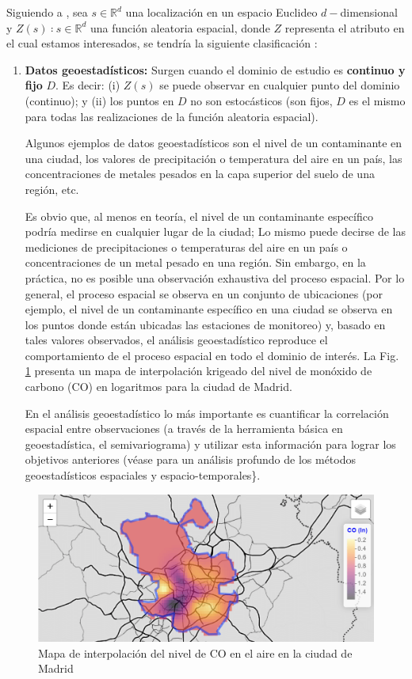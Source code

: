 \documentclass[
]{book}
\theoremstyle{definition}
\theoremstyle{definition}
\theoremstyle{definition}
\theoremstyle{definition}
\theoremstyle{remark}
\begin{document}
Siguiendo a \citet{cressie1993}, sea \(s ∈ ℝ^d\) una localización en un espacio Euclideo
\(d-\)dimensional y \({Z(s)∶ s ∈ ℝ^d}\) una función aleatoria espacial, donde \(Z\)
representa el atributo en el cual estamos interesados, se tendría la siguiente
clasificación \citep{montero_et_al_2015}:

\begin{enumerate}
\def\labelenumi{\arabic{enumi}.}
\item
  \textbf{Datos geoestadísticos:} Surgen cuando el dominio de estudio es \textbf{continuo
  y fijo} \(D\). Es decir: (i) \(Z(s)\) se puede observar en cualquier punto del
  dominio (continuo); y (ii) los puntos en \(D\) no son estocásticos (son fijos,
  \(D\) es el mismo para todas las realizaciones de la función aleatoria
  espacial).

  Algunos ejemplos de datos geoestadísticos son el nivel de un contaminante en
  una ciudad, los valores de precipitación o temperatura del aire en un país,
  las concentraciones de metales pesados en la capa superior del suelo de una
  región, etc.

  Es obvio que, al menos en teoría, el nivel de un contaminante específico
  podría medirse en cualquier lugar de la ciudad; Lo mismo puede decirse de
  las mediciones de precipitaciones o temperaturas del aire en un país o
  concentraciones de un metal pesado en una región. Sin embargo, en la
  práctica, no es posible una observación exhaustiva del proceso espacial. Por
  lo general, el proceso espacial se observa en un conjunto de ubicaciones
  (por ejemplo, el nivel de un contaminante específico en una ciudad se
  observa en los puntos donde están ubicadas las estaciones de monitoreo) y,
  basado en tales valores observados, el análisis geoestadístico reproduce el
  comportamiento de el proceso espacial en todo el dominio de interés. La Fig.
  \ref{fig:ejem-geo} presenta un mapa de interpolación krigeado del nivel de
  monóxido de carbono (CO) en logaritmos para la ciudad de Madrid.

  En el análisis geoestadístico lo más importante es cuantificar la
  correlación espacial entre observaciones (a través de la herramienta básica
  en geoestadística, el semivariograma) y utilizar esta información para
  lograr los objetivos anteriores (véase \citet{montero_et_al_2015} para un análisis
  profundo de los métodos geoestadísticos espaciales y espacio-temporales\}.
\end{enumerate}

\begin{figure}

{\centering \includegraphics[width=0.6\linewidth]{img/log_co_madrid} 

}

\caption{Mapa de interpolación del nivel de CO en el aire en la ciudad de Madrid}\label{fig:ejem-geo}
\end{figure}
\end{document}
